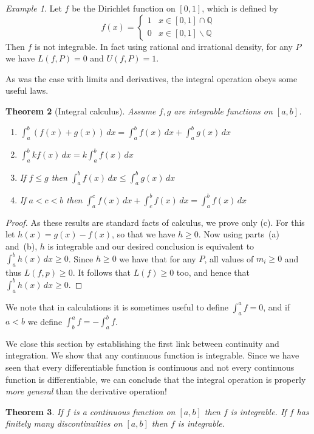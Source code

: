 \documentclass[11pt,oneside]{amsbook}
\newcommand{\Q}{\mathbb Q}
\renewcommand{\setminus}{\smallsetminus}
\theoremstyle{definition}
\theoremstyle{plain}
\newtheorem{theorem}{Theorem}[section]
\theoremstyle{definition}
\theoremstyle{remark}
\newtheorem{example}[theorem]{Example}
\numberwithin{equation}{section}
\numberwithin{figure}{section}
\begin{document}
\begin{example}
  Let $f$ be the Dirichlet function on $[0,1]$, which is defined by
  \[f(x)=\begin{cases}1&x\in[0,1]\cap\Q\\0&x\in[0,1]\setminus\Q\end{cases}
  \]
  Then $f$ is not integrable. In fact using rational and irrational density, for any $P$ we have $L(f,P)=0$ and $U(f,P)=1$.
\end{example}

As was the case with limits and derivatives, the integral operation obeys some useful laws.

\begin{theorem}[Integral calculus]
  Assume $f,g$ are integrable functions on $[a,b]$.
  \begin{enumerate}
    \item $\int_a^b(f(x)+g(x))\,dx=\int_a^bf(x)\,dx+\int_a^bg(x)\,dx$
    \item $\int_a^bkf(x)\,dx=k\int_a^bf(x)\,dx$
    \item If $f\leq g$ then $\int_a^bf(x)\,dx\leq\int_a^bg(x)\,dx$
    \item If $a<c<b$ then $\int_a^cf(x)\,dx+\int_c^bf(x)\,dx=\int_a^bf(x)\,dx$
  \end{enumerate}
\end{theorem}

\begin{proof}
  As these results are standard facts of calculus, we prove only (c). For this let $h(x)=g(x)-f(x)$, so that we have $h\geq0$. Now using parts~(a) and~(b), $h$ is integrable and our desired conclusion is equivalent to $\int_a^bh(x)\,dx\geq0$. Since $h\geq0$ we have that for any $P$, all values of $m_i\geq0$ and thus $L(f,p)\geq0$. It follows that $L(f)\geq0$ too, and hence that $\int_a^bh(x)\,dx\geq0$.
\end{proof}

We note that in calculations it is sometimes useful to define $\int_a^a f=0$, and if $a<b$ we define $\int_b^a f=-\int_a^b f$.

We close this section by establishing the first link between continuity and integration. We show that any continuous function is integrable. Since we have seen that every differentiable function is continuous and not every continuous function is differentiable, we can conclude that the integral operation is properly \emph{more general} than the derivative operation!

\begin{theorem}
  If $f$ is a continuous function on $[a,b]$ then $f$ is integrable. If $f$ has finitely many discontinuities on $[a,b]$ then $f$ is integrable.
\end{theorem}
\end{document}
